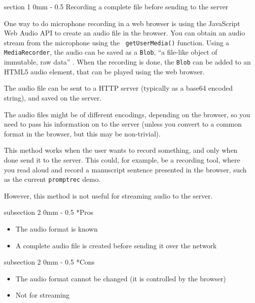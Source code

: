 \documentclass[11pt, a4paper, twoside]{article}
\makeatletter
\renewcommand{\subsection}{\@startsection
  {subsection}%
  {2}%
  {0mm}%
  {-\baselineskip}%
  {0.5\baselineskip}%
  {\bfseries\sffamily\large}}%
\renewcommand{\section}{\@startsection
  {section}%
  {1}%
  {0mm}%
  {-\baselineskip}%
  {0.5\baselineskip}%
  {\bfseries\sffamily\Large}}%
\makeatother
\begin{document}
\section{Recording a complete file before sending to the server}

One way to do microphone recording in a web browser is using the
JavaScript Web Audio API to create an audio file in the browser. You
can obtain an audio stream from the microphone using the {\tt
  getUserMedia()} function. Using a {\tt MediaRecorder}, the audio can
be saved as a {\tt Blob}, ``a file-like object of immutable, raw
data'' \cite{blob}. When the recording is done, the {\tt Blob} can be
added to an HTML5 audio element, that can be played using the web
browser.

The audio file can be sent to a HTTP server (typically as a base64 encoded
string), and saved on the server.

The audio files might be of different encodings, depending on
the browser, so you need to pass his information on to the server
(unless you convert to a common format in the browser, but this may be
non-trivial).

This method works when the user wants to record something, and only
when done send it to the server. This could, for example, be a
recording tool, where you read aloud and record a manuscript sentence
presented in the browser, such as the current {\tt promptrec} demo.

However, this method is not useful for streaming audio to the server.

\subsection*{Pros}
\begin{itemize}
\item The audio format is known
\item A complete audio file is created before sending it over the network
\end{itemize}

\subsection*{Cons}
\begin{itemize}
\item The audio format cannot be changed (it is controlled by the browser)
\item Not for streaming
\end{itemize}
\end{document}
